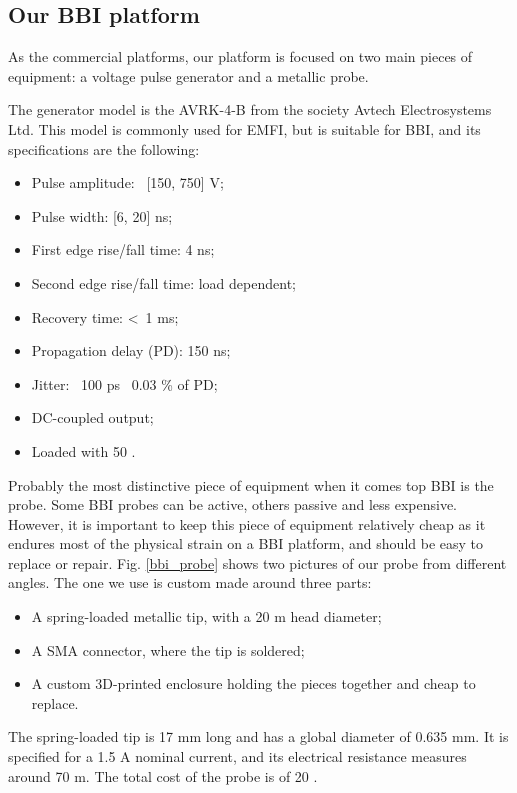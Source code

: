 	\subsection{Our BBI platform}
		As the commercial platforms, our platform is focused on two main pieces of equipment: a voltage pulse generator and a metallic probe.
		
		The generator model is the AVRK-4-B from the society Avtech Electrosystems Ltd.
		This model is commonly used for EMFI, but is suitable for BBI, and its specifications are the following:
		\begin{itemize}
			\item Pulse amplitude: \textpm\ [150, 750] V;
			\item Pulse width: [6, 20] ns;
			\item First edge rise/fall time: 4 ns;
			\item Second edge rise/fall time: load dependent;
			\item Recovery time: \textless\ 1 ms;
			\item Propagation delay (PD): 150 ns;
			\item Jitter: \textpm\ 100 ps \textpm\ 0.03 \% of PD;
			\item DC-coupled output;
			\item Loaded with 50 \textOmega.
		\end{itemize}
		
		Probably the most distinctive piece of equipment when it comes top BBI is the probe.
		Some BBI probes can be active, others passive and less expensive.
		However, it is important to keep this piece of equipment relatively cheap as it endures most of the physical strain on a BBI platform, and should be easy to replace or repair.
		Fig. \ref{bbi_probe} shows two pictures of our probe from different angles.
		The one we use is custom made around three parts:
		\begin{itemize}
			\item A spring-loaded metallic tip, with a 20 \textmu m head diameter;
			\item A SMA connector, where the tip is soldered;
			\item A custom 3D-printed enclosure holding the pieces together and cheap to replace.
		\end{itemize}
		The spring-loaded tip is 17 mm long and has a global diameter of 0.635 mm.
		It is specified for a 1.5 A nominal current, and its electrical resistance measures around 70 m\textOmega.
		The total cost of the probe is of 20 \texteuro.

